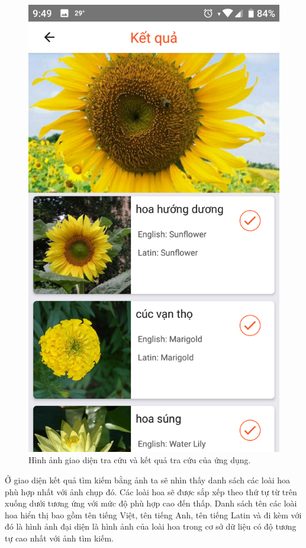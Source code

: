 \documentclass[12pt]{report}
\begin{document}
\begin{figure}[h]
			\includegraphics[scale=0.2]{app_search2}
			\caption{Hình ảnh giao diện tra cứu và kết quả tra cứu của ứng dụng.}
			\label{fig:app_search}
		\end{figure}\newpage
				
		Ở giao diện kết quả tìm kiếm bằng ảnh ta sẽ nhìn thấy danh sách các loài hoa phù hợp nhất với ảnh chụp đó. Các loài hoa sẽ được sắp xếp theo thứ tự từ trên xuống dưới tương ứng với mức độ phù hợp cao đến thấp. Danh sách tên các loài hoa hiển thị bao gồm tên tiếng Việt, tên tiếng Anh, tên tiếng Latin và đi kèm với đó là hình ảnh đại diện là hình ảnh của loài hoa trong cơ sở dữ liệu có độ tương tự cao nhất với ảnh tìm kiếm. \newpage
				
\end{document}
